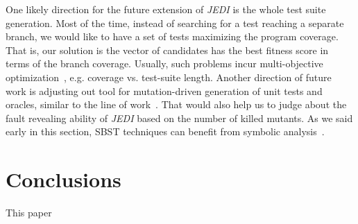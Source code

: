 \documentclass[sigconf,review,anonymous]{acmart}
\begin{document}
One likely direction for the future extension of \emph{JEDI} is the whole test suite generation. Most of the time, instead of searching for a test reaching a separate branch, we would like to have a set of tests maximizing the program coverage. That is, our solution is the vector of candidates has the best fitness score in terms of the branch coverage. Usually, such problems incur multi-objective optimization~\cite{lakhotia2007multi}, e.g. coverage vs. test-suite length. Another direction of future work is adjusting out tool for mutation-driven generation of unit tests and oracles, similar to the line of work~\cite{fraser2012mutation}. That would also help us to judge about the fault revealing ability of \emph{JEDI} based on the number of killed mutants. As we said early in this section, SBST techniques can benefit from symbolic analysis~\cite{baars2011symbolic}.



\section{Conclusions}
\label{sec:concl}
This paper 


 
\end{document}
